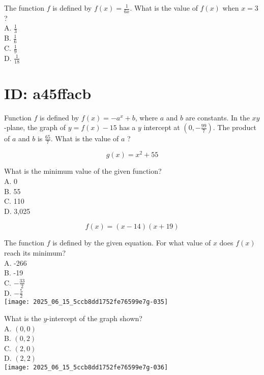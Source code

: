 





The function $f$ is defined by $f(x)=\frac{1}{6 x}$. What is the value of $f(x)$ when $x=3$ ?\\
A. $\frac{1}{3}$\\
B. $\frac{1}{6}$\\
C. $\frac{1}{9}$\\
D. $\frac{1}{18}$








\section*{ID: a45ffacb}
Function $f$ is defined by $f(x)=-a^{x}+b$, where $a$ and $b$ are constants. 
In the $x y$-plane, the graph of $y=f(x)-15$ has a $y$ intercept at 
$\left(0,-\frac{99}{7}\right)$. The product of $a$ and $b$ is $\frac{65}{7}$. 
What is the value of $a$ ?

$$
g(x)=x^{2}+55
$$

What is the minimum value of the given function?\\
A. 0\\
B. 55\\
C. 110\\
D. 3,025












$$
f(x)=(x-14)(x+19)
$$

The function $f$ is defined by the given equation. For what value of $x$ does $f(x)$ reach its minimum?\\
A. -266\\
B. -19\\
C. $-\frac{33}{2}$\\
D. $-\frac{5}{2}$\\
\texttt{[image: 2025\_06\_15\_5ccb8dd1752fe76599e7g-035]}

What is the $y$-intercept of the graph shown?\\
A. $(0,0)$\\
B. $(0,2)$\\
C. $(2,0)$\\
D. $(2,2)$\\
\texttt{[image: 2025\_06\_15\_5ccb8dd1752fe76599e7g-036]}

